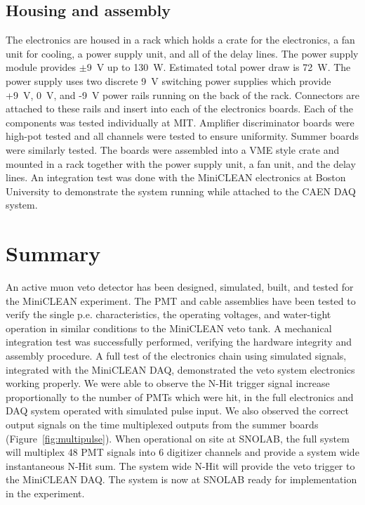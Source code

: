 \documentclass[review,number,sort&compress]{elsarticle}
\begin{document}
\subsection{Housing and assembly}
\label{sec:Housing}
%
The electronics are housed in a rack which holds a crate for the
electronics, a fan unit for cooling, a power supply unit, and all of
the delay lines. The power supply module provides $\pm$9~V up to
130~W. Estimated total power draw is 72~W. The power supply uses two
discrete 9~V switching power supplies which provide +9~V, 0~V, and
-9~V power rails running on the back of the rack. Connectors are
attached to these rails and insert into each of the electronics
boards. Each of the components was tested individually at MIT.
Amplifier discriminator boards were high-pot tested and all channels
were tested to ensure uniformity. Summer boards were similarly tested.
The boards were assembled into a VME style crate and mounted in a rack
together with the power supply unit, a fan unit, and the delay lines.
An integration test was done with the MiniCLEAN electronics at Boston
University to demonstrate the system running while attached to the
CAEN DAQ system.

\section{Summary}
\label{Summary}
%
An active muon veto detector has been designed, simulated, built, and
tested for the MiniCLEAN experiment.  The PMT and cable assemblies
have been tested to verify the single p.e. characteristics, the
operating voltages, and water-tight operation in similar conditions to
the MiniCLEAN veto tank.  A mechanical integration test was
successfully performed, verifying the hardware integrity and assembly
procedure.  A full test of the electronics chain using simulated
signals, integrated with the MiniCLEAN DAQ, demonstrated the veto
system electronics working properly. We were able to observe the N-Hit
trigger signal increase proportionally to the number of PMTs which
were hit, in the full electronics and DAQ system operated with
simulated pulse input. We also observed the correct output signals on
the time multiplexed outputs from the summer boards
(Figure~\ref{fig:multipulse}).  When operational on site at SNOLAB,
the full system will multiplex 48 PMT signals into 6 digitizer
channels and provide a system wide instantaneous N-Hit sum. The system
wide N-Hit will provide the veto trigger to the MiniCLEAN DAQ. The
system is now at SNOLAB ready for implementation in the experiment.
\end{document}
